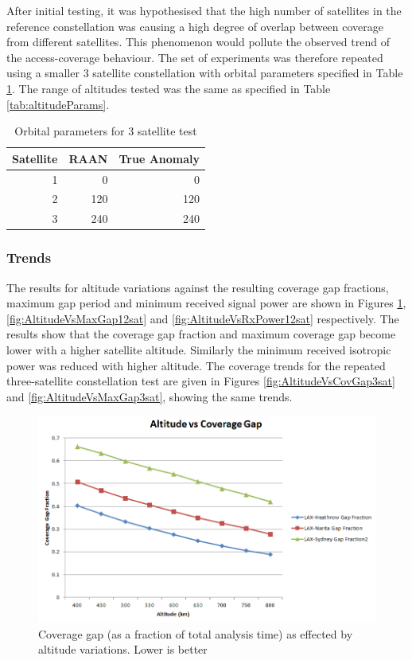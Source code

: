 After initial testing, it was hypothesised that the high number of satellites in the reference constellation was causing a high degree of overlap between coverage from different satellites. This phenomenon would pollute the observed trend of the access-coverage behaviour. The set of experiments was therefore repeated using a smaller 3 satellite constellation with orbital parameters specified in Table \ref{tab:3sat_config}. The range of altitudes tested was the same as specified in Table \ref{tab:altitudeParams}.
\begin{table}[htbp]
  \centering
  \caption{Orbital parameters for 3 satellite test}
    \begin{tabular}{rrr}
    \toprule
    Satellite & RAAN  & True Anomaly \\
    \midrule
    1     & 0     & 0 \\
    2     & 120   & 120 \\
    3     & 240   & 240 \\
    \bottomrule
    \end{tabular}%
  \label{tab:3sat_config}%
\end{table}%



\subsubsection{Trends}
The results for altitude variations against the resulting coverage gap fractions, maximum gap period and minimum received signal power are shown in Figures \ref{fig:AltitudeVsCovGap12sat}, \ref{fig:AltitudeVsMaxGap12sat} and \ref{fig:AltitudeVsRxPower12sat} respectively. The results show that the coverage gap fraction and maximum coverage gap become lower with a higher satellite altitude. Similarly the minimum received isotropic power was reduced with higher altitude.  The coverage trends for the repeated three-satellite constellation test are given in Figures \ref{fig:AltitudeVsCovGap3sat} and \ref{fig:AltitudeVsMaxGap3sat}, showing the same trends.
\begin{figure}[htbp]
	\centering
	\includegraphics[scale = 0.6]{Pictures/AltitudeVsCovGap12sat.png}
	
	\caption{Coverage gap (as a fraction of total analysis time) as effected by altitude variations. Lower is better}
	\label{fig:AltitudeVsCovGap12sat}
\end{figure} 


